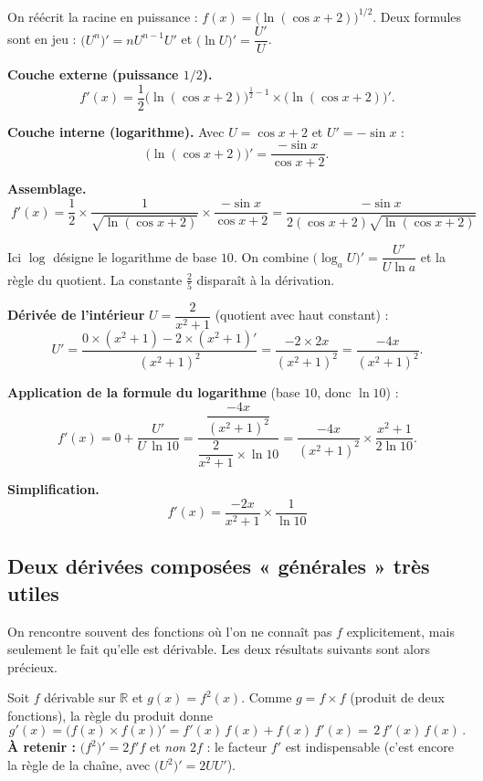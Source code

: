 \documentclass[11pt,a4paper]{article}
\newcommand{\R}{\mathbb{R}}
\begin{document}
\begin{exemple}[Racine d'un logarithme : $y=\sqrt{\ln(\cos x+2)}$]
On réécrit la racine en puissance : $f(x)=\big(\ln(\cos x+2)\big)^{1/2}$. Deux formules sont en jeu :
$\big(U^n\big)'=nU^{n-1}U'$ et $\big(\ln U\big)'=\dfrac{U'}{U}$.

\medskip
\textbf{Couche externe (puissance $1/2$).}
\[
   f'(x)=\frac12\big(\ln(\cos x+2)\big)^{\frac12-1}\times\big(\ln(\cos x+2)\big)'.
\]

\textbf{Couche interne (logarithme).} Avec $U=\cos x+2$ et $U'=-\sin x$ :
\[
   \big(\ln(\cos x+2)\big)'=\frac{-\sin x}{\cos x+2}.
\]

\textbf{Assemblage.}
\[
   \boxed{\;f'(x)=\frac12\times\frac{1}{\sqrt{\ln(\cos x+2)}}\times\frac{-\sin x}{\cos x+2}
   =\frac{-\sin x}{2(\cos x+2)\sqrt{\ln(\cos x+2)}}\;}
\]
\end{exemple}

\begin{exemple}[Logarithme décimal d'un quotient : $y=\dfrac{2}{5}+\log\!\left(\dfrac{2}{x^2+1}\right)$]
Ici $\log$ désigne le logarithme de base $10$. On combine $\big(\log_a U\big)'=\dfrac{U'}{U\ln a}$ et
la règle du quotient. La constante $\tfrac25$ disparaît à la dérivation.

\medskip
\textbf{Dérivée de l'intérieur} $U=\dfrac{2}{x^2+1}$ (quotient avec haut constant) :
\[
   U'=\frac{0\times(x^2+1)-2\times(x^2+1)'}{(x^2+1)^2}=\frac{-2\times 2x}{(x^2+1)^2}=\frac{-4x}{(x^2+1)^2}.
\]

\textbf{Application de la formule du logarithme} (base $10$, donc $\ln 10$) :
\[
   f'(x)=0+\frac{U'}{U\,\ln 10}
        =\frac{\dfrac{-4x}{(x^2+1)^2}}{\dfrac{2}{x^2+1}\times\ln 10}
        =\frac{-4x}{(x^2+1)^2}\times\frac{x^2+1}{2\ln 10}.
\]

\textbf{Simplification.}
\[
   \boxed{\;f'(x)=\frac{-2x}{x^2+1}\times\frac{1}{\ln 10}\;}
\]
\end{exemple}

\subsection{Deux dérivées composées « générales » très utiles}

On rencontre souvent des fonctions où l'on ne connaît pas $f$ explicitement, mais seulement le fait
qu'elle est dérivable. Les deux résultats suivants sont alors précieux.

\begin{exemple}[Le carré d'une fonction : $g=f^2$]
Soit $f$ dérivable sur $\R$ et $g(x)=f^2(x)$. Comme $g=f\times f$ (produit de deux fonctions),
la règle du produit donne
\[
   g'(x)=\big(f(x)\times f(x)\big)'=f'(x)\,f(x)+f(x)\,f'(x)=\boxed{\,2\,f'(x)\,f(x)\,}.
\]
\textbf{À retenir :} $\big(f^2\big)'=2f'f$ et \emph{non} $2f$ : le facteur $f'$ est indispensable
(c'est encore la règle de la chaîne, avec $\big(U^2\big)'=2UU'$).
\end{exemple}
\end{document}
